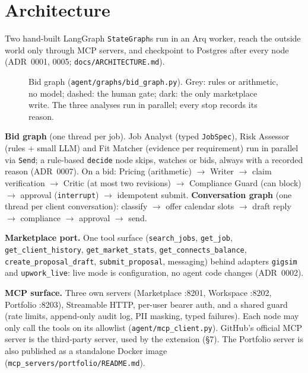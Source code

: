 \documentclass[10pt,a4paper]{article}
\newcommand{\code}[1]{\texttt{\small #1}}
\begin{document}
\section{Architecture}

Two hand-built LangGraph \code{StateGraph}s run in an Arq worker, reach the outside world only through MCP servers, and checkpoint to Postgres after every node (ADR~0001, 0005; \code{docs/ARCHITECTURE.md}).

\begin{figure}[h!]\centering
{}
\caption{Bid graph (\code{agent/graphs/bid\_graph.py}). Grey: rules or arithmetic, no model; dashed: the human gate; dark: the only marketplace write. The three analyses run in parallel; every stop records its reason.}
\end{figure}

\textbf{Bid graph} (one thread per job). Job Analyst (typed \code{JobSpec}), Risk Assessor (rules + small LLM) and Fit Matcher (evidence per requirement) run in parallel via \code{Send}; a rule-based \code{decide} node skips, watches or bids, always with a recorded reason (ADR~0007). On a bid: Pricing (arithmetic) $\to$ Writer $\to$ claim verification $\to$ Critic (at most two revisions) $\to$ Compliance Guard (can block) $\to$ approval (\code{interrupt}) $\to$ idempotent submit. \textbf{Conversation graph} (one thread per client conversation): classify $\to$ offer calendar slots $\to$ draft reply $\to$ compliance $\to$ approval $\to$ send.

\textbf{Marketplace port.} One tool surface (\code{search\_jobs}, \code{get\_job}, \code{get\_client\_history}, \code{get\_market\_stats}, \code{get\_connects\_balance}, \code{create\_proposal\_draft}, \code{submit\_proposal}, messaging) behind adapters \code{gigsim} and \code{upwork\_live}: live mode is configuration, no agent code changes (ADR~0002).

\textbf{MCP surface.} Three own servers (Marketplace :8201, Workspace :8202, Portfolio :8203), Streamable HTTP, per-user bearer auth, and a shared guard (rate limits, append-only audit log, PII masking, typed failures). Each node may only call the tools on its allowlist (\code{agent/mcp\_client.py}). GitHub's official MCP server is the third-party server, used by the extension (\S7). The Portfolio server is also published as a standalone Docker image (\code{mcp\_servers/portfolio/README.md}).
\end{document}
